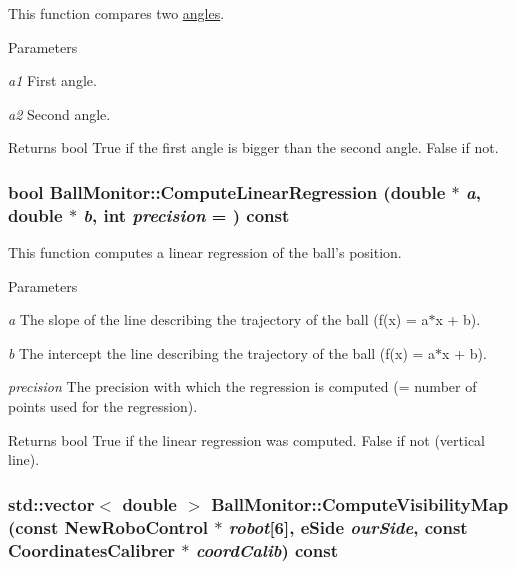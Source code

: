 This function compares two \hyperlink{structBallMonitor_1_1Angle}{angles}. 


\begin{DoxyParams}{Parameters}
\item[{\em a1}]First angle. \item[{\em a2}]Second angle. \end{DoxyParams}
\begin{DoxyReturn}{Returns}
bool True if the first angle is bigger than the second angle. False if not. 
\end{DoxyReturn}
\hypertarget{classBallMonitor_a49645db55ca752adbc2a5a074c7314be}{
\subsubsection[{ComputeLinearRegression}]{\setlength{\rightskip}{0pt plus 5cm}bool BallMonitor::ComputeLinearRegression (double $\ast$ {\em a}, \/  double $\ast$ {\em b}, \/  int {\em precision} = {}) const}}
\label{classBallMonitor_a49645db55ca752adbc2a5a074c7314be}


This function computes a linear regression of the ball's position. 


\begin{DoxyParams}{Parameters}
\item[{\em a}]The slope of the line describing the trajectory of the ball (f(x) = a$\ast$x + b). \item[{\em b}]The intercept the line describing the trajectory of the ball (f(x) = a$\ast$x + b). \item[{\em precision}]The precision with which the regression is computed (= number of points used for the regression). \end{DoxyParams}
\begin{DoxyReturn}{Returns}
bool True if the linear regression was computed. False if not (vertical line). 
\end{DoxyReturn}
\hypertarget{classBallMonitor_ac30119e22cfe4814670c4eae8c6b5495}{
\subsubsection[{ComputeVisibilityMap}]{\setlength{\rightskip}{0pt plus 5cm}std::vector$<$ double $>$ BallMonitor::ComputeVisibilityMap (const {\bf NewRoboControl} $\ast$ {\em robot}\mbox{[}6\mbox{]}, \/  eSide {\em ourSide}, \/  const {\bf CoordinatesCalibrer} $\ast$ {\em coordCalib}) const}}
\label{classBallMonitor_ac30119e22cfe4814670c4eae8c6b5495}


